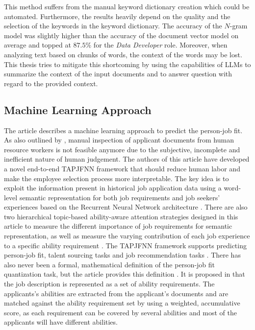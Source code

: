 \documentclass[draft,final]{thesisclass} %
\begin{document}
This method suffers from the manual keyword dictionary creation which could be automated. 
Furthermore, the results heavily depend on the quality and the selection of the keywords in the keyword dictionary.
The accuracy of the $N$-gram model was slightly higher than the accuracy of the document vector model on average and topped at $87.5\%$ for the \textit{Data Developer} role.
Moreover, when analyzing text based on chunks of words, the context of the words may be lost.
This thesis tries to mitigate this shortcoming by using the capabilities of \acs{LLM}s to summarize the context of the input documents and to answer question with regard to the provided context.

\subsection{Machine Learning Approach} \label{machine_learning_approach}
The article \textcite{pj_fit_ml} describes a machine learning approach to predict the person-job fit.
As also outlined by \textcite[1]{pj_fit_ml}, manual inspection of applicant documents from human resource workers is not feasible anymore due to the subjective, incomplete and inefficient nature of human judgement.
The authors of this article have developed a novel end-to-end \gls{TAPJFNN} framework that should reduce human labor and make the employee selection process more interpretable.
The key idea is to exploit the information present in historical job application data using a word-level semantic representation for both job requirements and job seekers' experiences based on the Recurrent Neural Network architecture \parencite[1]{pj_fit_ml}.
There are also two hierarchical topic-based ability-aware attention strategies designed in this article to measure the different importance of job requirements for semantic representation, as well as measure the varying contribution of each job experience to a specific ability requirement \parencite[1]{pj_fit_ml}.
The \acs{TAPJFNN} framework supports predicting person-job fit, talent sourcing tasks and job recommendation tasks \parencite[1]{pj_fit_ml}.
There has also never been a formal, mathematical definition of the person-job fit quantization task, but the article \textcite{pj_fit_ml} provides this definition \parencite[2]{pj_fit_ml}.
It is proposed in \textcite[2]{pj_fit_ml} that the job description is represented as a set of ability requirements.
The applicants's abilities are extracted from the applicant's documents and are matched against the ability requirement set by using a weighted, accumulative score, as each requirement can be covered by several abilities and most of the applicants will have different abilities. 
\end{document}
